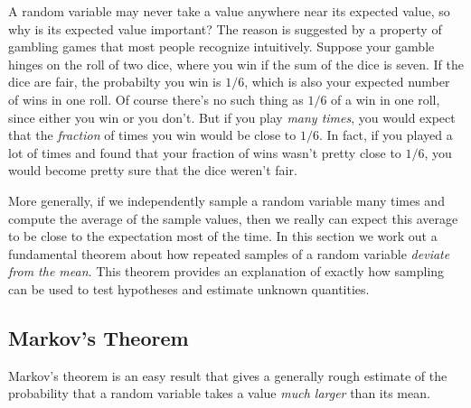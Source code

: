 A random variable may never take a value anywhere near its expected value,
so why is its expected value important?  The reason is suggested by a
property of gambling games that most people recognize intuitively.
Suppose your gamble hinges on the roll of two dice, where you win if the
sum of the dice is seven.  If the dice are fair, the probabilty you win is
$1/6$, which is also your expected number of wins in one roll.  Of course
there's no such thing as $1/6$ of a win in one roll, since either you win
or you don't.  But if you play \emph{many times}, you would expect that
the \emph{fraction} of times you win would be close to $1/6$.  In fact, if
you played a lot of times and found that your fraction of wins wasn't
pretty close to $1/6$, you would become pretty sure that the dice weren't
fair.

More generally, if we independently sample a random variable many times
and compute the average of the sample values, then we really can expect
this average to be close to the expectation most of the time.  In this
section we work out a fundamental theorem about how repeated samples of a
random variable \emph{deviate from the mean}.  This theorem provides an
explanation of exactly how sampling can be used to test hypotheses and
estimate unknown quantities.

\subsection{Markov's Theorem}
Markov's theorem is an easy result that gives a generally rough estimate
of the probability that a random variable takes a value \emph{much larger}
than its mean.

